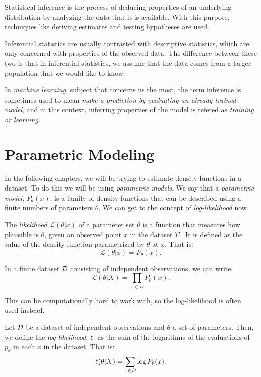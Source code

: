 Statistical inference is the process of deducing properties of an underlying distribution by analyzing the data that it is available. With this purpose, techniques like deriving estimates and testing hypotheses are used. 

Inferential statistics are usually contrasted with descriptive statistics, which are only concerned with properties of the observed data. The difference between these two is that in inferential statistics, we assume that the data comes from a larger
population that we would like to know.

In \emph{machine learning}, subject that concerns us the most, the term inference is sometimes used to mean \emph{make a prediction by evaluating an already trained model}, and in this context, inferring properties of the model is refered as \emph{training or learning}.

\section{Parametric Modeling}

In the following chapters, we will be trying to estimate density functions in a dataset. To do this we will be using \emph{parametric models}. We say that a \emph{parametric model}, $P_\theta(x)$, 
is a family of density functions that can be described using a finite numbers of parameters $\theta$. We can get to the concept of \emph{log-likelihood} now.

\begin{ndef}
The \emph{likelihood} $\mathcal L(\theta | x)$ of a parameter set $\theta$ is a function that measures how plausible is $\theta$, given an observed point $x$ in the dataset $\mathcal{D}$. It is defined as the value of the 
density function parametrized by $\theta$ at $x$. That is:
$$
\mathcal L(\theta|x) = P_\theta(x).
$$
\end{ndef}

In a finite dataset $\mathcal{D}$ consisting of independent observations, we can write:
\[
\mathcal L(\theta | X) = \prod_{x \in D} P_\theta(x).
\]

This can be computationally hard to work with, so the log-likelihood is often used instead.

\begin{ndef}
Let $\mathcal{D}$ be a dataset of independent observations and $\theta$ a set of parameters. Then, we define the \emph{log-likelihood} $\ell$ as the sum of the logarithms of the evaluations of $p_\theta$ in each $x$ in the dataset. That is:
\[
\ell (\theta | X) = \sum_{x \in \mathcal{D}} \log P_\theta(x).
\]
\end{ndef}

